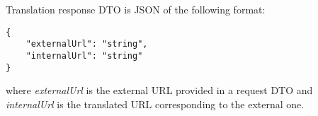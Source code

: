 \documentclass[../main.tex]{subfiles}
\begin{document}
Translation response DTO is JSON of the following format:
\begin{lstlisting}[numbers=none]
{
    "externalUrl": "string",
    "internalUrl": "string"
}
\end{lstlisting}

where \textit{externalUrl} is the external URL provided in a request DTO and \textit{internalUrl} is the translated URL corresponding to the external one.
\end{document}
